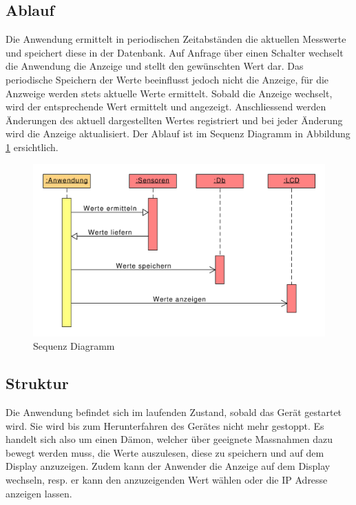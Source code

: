 \documentclass[
    10pt,
    a4paper,
]{scrartcl}
\begin{document}
\subsection{Ablauf}

Die Anwendung ermittelt in periodischen Zeitabständen die aktuellen Messwerte und
speichert diese in der Datenbank. Auf Anfrage über einen Schalter wechselt die Anwendung
die Anzeige und stellt den gewünschten Wert dar. Das periodische Speichern der Werte
beeinflusst jedoch nicht die Anzeige, für die Anzweige werden stets aktuelle Werte
ermittelt. Sobald die Anzeige wechselt, wird der entsprechende Wert ermittelt und
angezeigt. Anschliessend werden Änderungen des aktuell dargestellten Wertes registriert
und bei jeder Änderung wird die Anzeige aktualisiert. Der Ablauf ist im Sequenz Diagramm
in Abbildung \ref{fig:sequence-diagram} ersichtlich.

\begin{figure}[ht]
    \centering
    \includegraphics[width=\textwidth]{sequence-diagram}
    \caption{Sequenz Diagramm}
    \label{fig:sequence-diagram}
\end{figure}

\subsection{Struktur}
Die Anwendung befindet sich im laufenden Zustand, sobald das Gerät gestartet wird. Sie
wird bis zum Herunterfahren des Gerätes nicht mehr gestoppt. Es handelt sich also um einen
Dämon, welcher über geeignete Massnahmen dazu bewegt werden muss, die Werte auszulesen,
diese zu speichern und auf dem Display anzuzeigen. Zudem kann der Anwender die Anzeige auf
dem Display wechseln, resp. er kann den anzuzeigenden Wert wählen oder die IP Adresse
anzeigen lassen.
\end{document}
